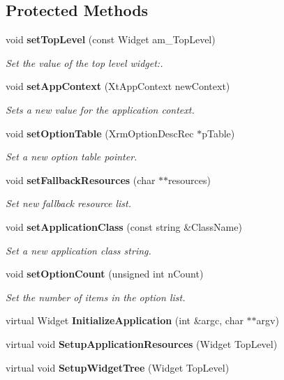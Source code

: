 \subsection*{Protected Methods}
\begin{CompactItemize}
\item 
void {\bf set\-Top\-Level} (const Widget am\_\-Top\-Level)
\begin{CompactList}\small\item\em Set the value of the top level widget:.\item\end{CompactList}\item 
void {\bf set\-App\-Context} (Xt\-App\-Context new\-Context)
\begin{CompactList}\small\item\em Sets a new value for the application context.\item\end{CompactList}\item 
void {\bf set\-Option\-Table} (Xrm\-Option\-Desc\-Rec $\ast$p\-Table)
\begin{CompactList}\small\item\em Set a new option table pointer.\item\end{CompactList}\item 
void {\bf set\-Fallback\-Resources} (char $\ast$$\ast$resources)
\begin{CompactList}\small\item\em Set new fallback resource list.\item\end{CompactList}\item 
void {\bf set\-Application\-Class} (const string \&Class\-Name)
\begin{CompactList}\small\item\em Set a new application class string.\item\end{CompactList}\item 
void {\bf set\-Option\-Count} (unsigned int n\-Count)
\begin{CompactList}\small\item\em Set the number of items in the option list.\item\end{CompactList}\item 
virtual Widget {\bf Initialize\-Application} (int \&argc, char $\ast$$\ast$argv)
\item 
virtual void {\bf Setup\-Application\-Resources} (Widget Top\-Level)
\item 
virtual void {\bf Setup\-Widget\-Tree} (Widget Top\-Level)
\end{CompactItemize}

